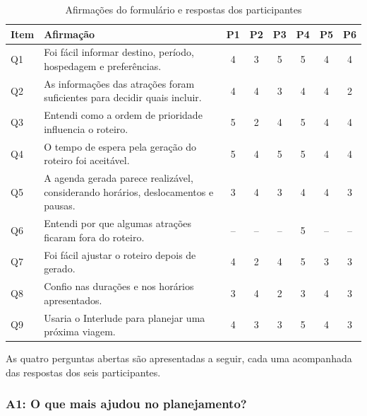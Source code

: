 \begin{table}[H]
\centering
\small
\caption{Afirmações do formulário e respostas dos participantes}
\label{tab:participantes-escala}
\begin{tabularx}{\textwidth}{l>{\raggedright\arraybackslash}Xcccccc}
\hline
\textbf{Item} & \textbf{Afirmação} & \textbf{P1} & \textbf{P2} & \textbf{P3} & \textbf{P4} & \textbf{P5} & \textbf{P6} \\
\hline
Q1 & Foi fácil informar destino, período, hospedagem e preferências. & 4 & 3 & 5 & 5 & 4 & 4 \\
Q2 & As informações das atrações foram suficientes para decidir quais incluir. & 4 & 4 & 3 & 4 & 4 & 2 \\
Q3 & Entendi como a ordem de prioridade influencia o roteiro. & 5 & 2 & 4 & 5 & 4 & 4 \\
Q4 & O tempo de espera pela geração do roteiro foi aceitável. & 5 & 4 & 5 & 5 & 4 & 4 \\
Q5 & A agenda gerada parece realizável, considerando horários, deslocamentos e pausas. & 3 & 4 & 3 & 4 & 4 & 3 \\
Q6 & Entendi por que algumas atrações ficaram fora do roteiro. & -- & -- & -- & 5 & -- & -- \\
Q7 & Foi fácil ajustar o roteiro depois de gerado. & 4 & 2 & 4 & 5 & 3 & 3 \\
Q8 & Confio nas durações e nos horários apresentados. & 3 & 4 & 2 & 3 & 4 & 3 \\
Q9 & Usaria o Interlude para planejar uma próxima viagem. & 4 & 3 & 3 & 5 & 4 & 3 \\
\hline
\end{tabularx}
\end{table}

As quatro perguntas abertas são apresentadas a seguir, cada uma acompanhada das respostas dos seis participantes.

\subsubsection{A1: O que mais ajudou no planejamento?}

